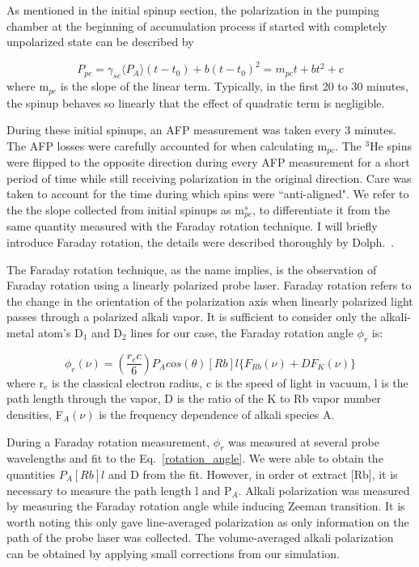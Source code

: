 As mentioned in the initial spinup section, the polarization in the pumping chamber at the beginning of accumulation process if started with completely unpolarized state can be described by 

\begin{equation}
P_{pc} = \gamma_{se}\langle P_{A}\rangle (t-t_{0})+b(t-t_{0})^{2} = m_{pc}t + bt^{2} + c
\end{equation}
where m$_{pc}$ is the slope of the linear term. Typically, in the first 20 to 30 minutes, the spinup behaves so linearly that the effect of quadratic term is negligible.

During these initial spinups, an AFP measurement was taken every 3 minutes. The AFP losses were carefully accounted for when calculating m$_{pc}$. The $^{3}$He spins were flipped to the opposite direction during every AFP measurement for a short period of time while still receiving polarization in the original direction. Care was taken to account for the time during which spins were ``anti-aligned". We refer to the the slope collected from initial spinups as m$_{pc}^{s}$, to differentiate it from the same quantity measured with the Faraday rotation technique. I will briefly introduce Faraday rotation, the details were described thoroughly by Dolph.~\cite{PeterThesis}.

The Faraday rotation technique, as the name implies, is the observation of Faraday rotation using a linearly polarized probe laser. Faraday rotation refers to the change in the orientation of the polarization axis when linearly polarized light passes through a polarized alkali vapor. It is sufficient to consider only the alkali-metal atom's D$_{1}$ and D$_{2}$ lines for our case, the Faraday rotation angle $\phi_{r}$ is:

\begin{equation}\label{rotation_angle}
\phi_{r}(\nu)=\left(\frac{r_{e}c}{6}\right)P_{A}cos(\theta)[Rb]l\{F_{Rb}(\nu)+DF_{K}(\nu)\}
\end{equation}
where r$_{e}$ is the classical electron radius, c is the speed of light in vacuum, l is the path length through the vapor, D is the ratio of the K to Rb vapor number densities, F$_{A}(\nu)$ is the frequency dependence of alkali species A. 

During a Faraday rotation measurement, $\phi_{r}$ was measured at several probe wavelengths and fit to the Eq.~\ref{rotation_angle}. We were able to obtain the quantities $P_{A}[Rb]l$ and D from the fit. However, in order ot extract [Rb], it is necessary to measure the path length l and P$_{A}$. Alkali polarization was measured by measuring the Faraday rotation angle while inducing Zeeman transition. It is worth noting this only gave line-averaged polarization as only information on the path of the probe laser was collected. The volume-averaged alkali polarization can be obtained by applying small corrections from our simulation.

